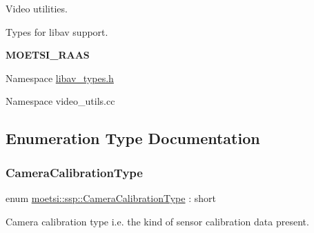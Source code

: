 Video utilities.

Types for libav support.

{\bfseries M\+O\+E\+T\+S\+I\+\_\+\+R\+A\+AS}

Namespace \hyperlink{libav__types_8h_source}{libav\+\_\+types.\+h}

Namespace video\+\_\+utils.\+cc 

\subsection{Enumeration Type Documentation}
\mbox{\label{namespacemoetsi_1_1ssp_a1f51291db51233dc5865d42e6ee36ef8}} 
\subsubsection{\texorpdfstring{Camera\+Calibration\+Type}{CameraCalibrationType}\hspace{0.1cm}{\footnotesize\ttfamily [1/2]}}
{\footnotesize\ttfamily enum \hyperlink{namespacemoetsi_1_1ssp_a1f51291db51233dc5865d42e6ee36ef8}{moetsi\+::ssp\+::\+Camera\+Calibration\+Type} \+: short\hspace{0.3cm}{\ttfamily [strong]}}



Camera calibration type i.\+e. the kind of sensor calibration data present. 

